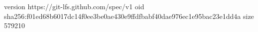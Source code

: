 version https://git-lfs.github.com/spec/v1
oid sha256:f01ed68b6017dc14f0ee3be0ae430e9ffdfbabf40dae976ec1e95bac23e1dd4a
size 579210
